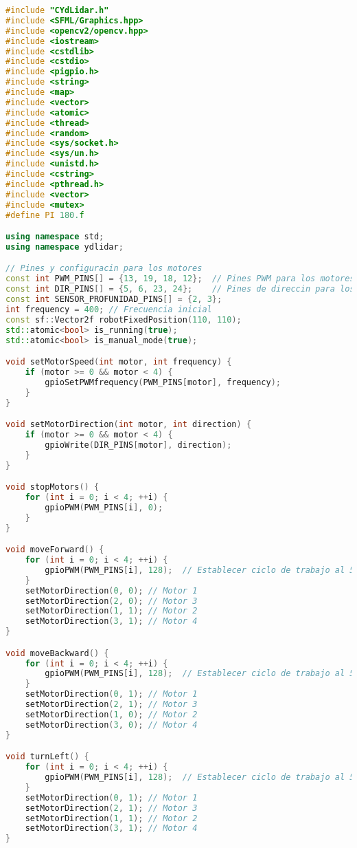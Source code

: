     \begin{lstlisting}[language={C++}, caption={Cuarto ajuste de c\'odigo}, label={CuartoAjuste}]
#include "CYdLidar.h"
#include <SFML/Graphics.hpp>
#include <opencv2/opencv.hpp>
#include <iostream>
#include <cstdlib>
#include <cstdio>
#include <pigpio.h>
#include <string>
#include <map>
#include <vector>
#include <atomic>
#include <thread>
#include <random>
#include <sys/socket.h>
#include <sys/un.h>
#include <unistd.h>
#include <cstring>
#include <pthread.h>
#include <vector>
#include <mutex>
#define PI 180.f

using namespace std;
using namespace ydlidar;

// Pines y configuracin para los motores
const int PWM_PINS[] = {13, 19, 18, 12};  // Pines PWM para los motores
const int DIR_PINS[] = {5, 6, 23, 24};    // Pines de direccin para los motores
const int SENSOR_PROFUNIDAD_PINS[] = {2, 3};
int frequency = 400; // Frecuencia inicial
const sf::Vector2f robotFixedPosition(110, 110);
std::atomic<bool> is_running(true);
std::atomic<bool> is_manual_mode(true);

void setMotorSpeed(int motor, int frequency) {
    if (motor >= 0 && motor < 4) {
        gpioSetPWMfrequency(PWM_PINS[motor], frequency);
    }
}

void setMotorDirection(int motor, int direction) {
    if (motor >= 0 && motor < 4) {
        gpioWrite(DIR_PINS[motor], direction);
    }
}

void stopMotors() {
    for (int i = 0; i < 4; ++i) {
        gpioPWM(PWM_PINS[i], 0);
    }
}

void moveForward() {
    for (int i = 0; i < 4; ++i) {
        gpioPWM(PWM_PINS[i], 128);  // Establecer ciclo de trabajo al 50%
    }
    setMotorDirection(0, 0); // Motor 1
    setMotorDirection(2, 0); // Motor 3
    setMotorDirection(1, 1); // Motor 2
    setMotorDirection(3, 1); // Motor 4
}

void moveBackward() {
    for (int i = 0; i < 4; ++i) {
        gpioPWM(PWM_PINS[i], 128);  // Establecer ciclo de trabajo al 50%
    }
    setMotorDirection(0, 1); // Motor 1
    setMotorDirection(2, 1); // Motor 3
    setMotorDirection(1, 0); // Motor 2
    setMotorDirection(3, 0); // Motor 4
}

void turnLeft() {
    for (int i = 0; i < 4; ++i) {
        gpioPWM(PWM_PINS[i], 128);  // Establecer ciclo de trabajo al 50%
    }
    setMotorDirection(0, 1); // Motor 1
    setMotorDirection(2, 1); // Motor 3
    setMotorDirection(1, 1); // Motor 2
    setMotorDirection(3, 1); // Motor 4
}


\end{lstlisting}
